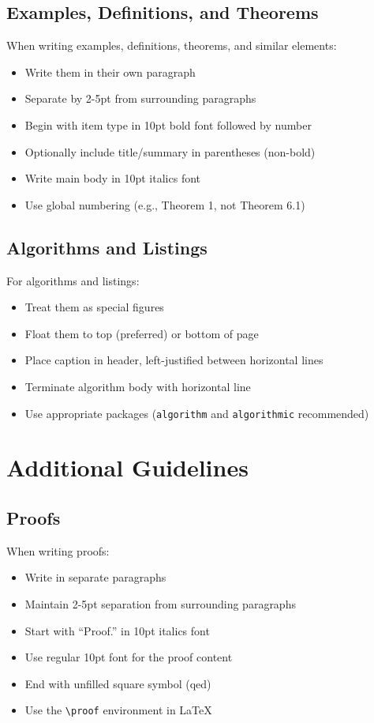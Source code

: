 \subsection{Examples, Definitions, and Theorems}
When writing examples, definitions, theorems, and similar elements:
\begin{itemize}
\item Write them in their own paragraph
\item Separate by 2-5pt from surrounding paragraphs
\item Begin with item type in 10pt bold font followed by number
\item Optionally include title/summary in parentheses (non-bold)
\item Write main body in 10pt italics font
\item Use global numbering (e.g., Theorem 1, not Theorem 6.1)
\end{itemize}

\subsection{Algorithms and Listings}
For algorithms and listings:
\begin{itemize}
\item Treat them as special figures
\item Float them to top (preferred) or bottom of page
\item Place caption in header, left-justified between horizontal lines
\item Terminate algorithm body with horizontal line
\item Use appropriate packages ({\tt algorithm} and {\tt algorithmic} recommended)
\end{itemize}

\section{Additional Guidelines}

\subsection{Proofs}
When writing proofs:
\begin{itemize}
\item Write in separate paragraphs
\item Maintain 2-5pt separation from surrounding paragraphs
\item Start with ``Proof.'' in 10pt italics font
\item Use regular 10pt font for the proof content
\item End with unfilled square symbol (qed)
\item Use the \texttt{\textbackslash{proof}} environment in \LaTeX
\end{itemize}
 
